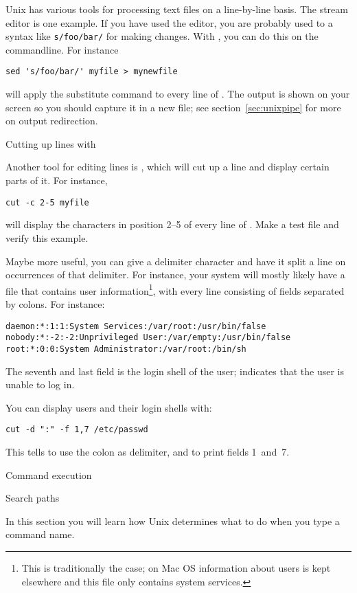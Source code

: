 Unix has various tools for processing text files on a line-by-line
basis. The stream editor  is one example. If you have used the
 editor, you are probably used to a syntax like
\verb+s/foo/bar/+ for making changes. With , you can do this on
the commandline. For instance
\begin{verbatim}
sed 's/foo/bar/' myfile > mynewfile
\end{verbatim}
will apply the substitute command  to every line of
. The output is shown on your screen so you should capture
it in a new file; see section~\ref{sec:unixpipe} for more on output
redirection.

 {Cutting up lines with \protect{}}

Another tool for editing lines is , which will cut up a line
and display certain parts of it. For instance,
\begin{verbatim}
cut -c 2-5 myfile
\end{verbatim}
will display the characters in position 2--5 of every line of
. Make a test file and verify this example.

Maybe more useful, you can give  a delimiter character and have
it split a line on occurrences of that delimiter. For instance, your system
will mostly likely have a file  that contains user
information\footnote{This is traditionally the case; on Mac OS
  information about users is kept elsewhere and this file only
  contains system services.}, with every line consisting of fields
separated by colons. For instance:
\begin{verbatim}
daemon:*:1:1:System Services:/var/root:/usr/bin/false
nobody:*:-2:-2:Unprivileged User:/var/empty:/usr/bin/false
root:*:0:0:System Administrator:/var/root:/bin/sh
\end{verbatim}
The seventh and last field is the login shell of the user;
 indicates that the user is unable to log in.

You can display users and their login shells with:
\begin{verbatim}
cut -d ":" -f 1,7 /etc/passwd
\end{verbatim}
This tells  to use the colon as delimiter, and to print fields
1~and~7.

 {Command execution}

 {Search paths}
\begin{purpose}
  In this section you will learn how Unix determines what to do when
  you type a command name.
\end{purpose}

